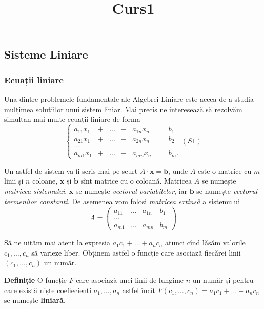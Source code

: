\documentclass[11pt]{article}
\title{Curs1}
\begin{document}
    
    \maketitle
    
    

    
    \hypertarget{sisteme-liniare}{%
\subsection{Sisteme Liniare}\label{sisteme-liniare}}

    \hypertarget{ecuaux21bii-liniare}{%
\subsubsection{Ecuații liniare}\label{ecuaux21bii-liniare}}

    Una dintre problemele fundamentale ale Algebrei Liniare este aceea de a
studia mulțimea soluțiilor unui sistem liniar. Mai precis ne interesează
să rezolvăm simultan mai multe ecuații liniare de forma \[
\left\{\begin{matrix} a_{11}x_1 & + & \dots & + & a_{1n}x_n & = & b_1 \\
a_{21}x_1 & + & \dots & + & a_{2n}x_n & = & b_2 \\
\ldots\\
a_{m1}x_1 & + & \dots & + & a_{mn}x_n & = & b_m. 
\end{matrix}\right. (S1)
\]

Un astfel de sistem va fi scris mai pe scurt
\(A\cdot\mathbf{x}=\mathbf{b}\), unde \(A\) este o matrice cu \(m\)
linii și \(n\) coloane, \(\mathbf{x}\) și \(\mathbf{b}\) sînt matrice cu
o coloană. Matricea \(A\) se numește \emph{matricea sistemului},
\(\mathbf{x}\) se numește \emph{vectorul variabilelor}, iar
\(\mathbf{b}\) se numește \emph{vectorul termenilor constanți}. De
asemenea vom folosi \emph{matricea extinsă} a sistemului \[
\overline{A}=\left(\begin{matrix} a_{11} & \dots & a_{1n} & b_1 \\ 
\ldots \\
a_{m1} & \dots & a_{mn} & b_m 
\end{matrix}
\right)
\]

Să ne uităm mai atent la expresia \(a_1c_1+\dots + a_nc_n\) atunci cînd
lăsăm valorile \(c_1,\dots, c_n\) să varieze liber. Obținem astfel o
funcție care asociază fiecărei linii \(\left(c_1,\dots,c_n\right)\) un
număr.

\textbf{Definiție} O funcție \(F\) care asociază unei linii de lungime
\(n\) un număr și pentru care există niște coefiecienți
\(a_1, \dots,a_n\) astfel încît
\(F(c_1,\dots,c_n) = a_1c_1+\dots + a_nc_n\) se numește
\textbf{liniară}.
\end{document}
